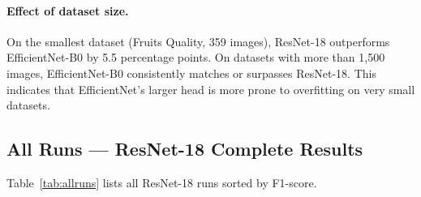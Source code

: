 \documentclass[12pt, a4paper]{article}
\begin{document}
\paragraph{Effect of dataset size.}
On the smallest dataset (Fruits Quality, 359 images), ResNet-18 outperforms
EfficientNet-B0 by 5.5 percentage points.
On datasets with more than 1,500 images, EfficientNet-B0 consistently matches
or surpasses ResNet-18.
This indicates that EfficientNet's larger head is more prone to overfitting
on very small datasets.

\subsection{All Runs --- ResNet-18 Complete Results}

Table~\ref{tab:allruns} lists all ResNet-18 runs sorted by F1-score.
\end{document}
